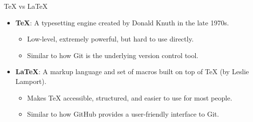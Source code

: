 \documentclass[x11names]{beamer} %
\begin{document}
\begin{frame}{TeX vs \LaTeX{}}
    \begin{itemize}
        \item \textbf{TeX}: A typesetting engine created by Donald Knuth in the late 1970s.
        \begin{itemize}
            \item Low-level, extremely powerful, but hard to use directly.
            \item Similar to how Git is the underlying version control tool.
        \end{itemize}
        
        \item \textbf{\LaTeX{}}: A markup language and set of macros built on top of TeX (by Leslie Lamport).
        \begin{itemize}
            \item Makes TeX accessible, structured, and easier to use for most people.
            \item Similar to how GitHub provides a user-friendly interface to Git.
        \end{itemize}
    \end{itemize}
    \end{frame}
\end{document}
